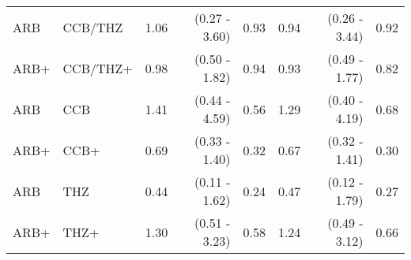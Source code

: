 \documentclass[11pt,]{article}
\begin{document}
\begin{table}[H]
{\begin{tabular}{llrrrrrr}
  ARB & CCB/THZ & 1.06 & (0.27 - 3.60) & 0.93 & 0.94 & (0.26 - 3.44) & 0.92 \\ 
  ARB+ & CCB/THZ+ & 0.98 & (0.50 - 1.82) & 0.94 & 0.93 & (0.49 - 1.77) & 0.82 \\ 
  ARB & CCB & 1.41 & (0.44 - 4.59) & 0.56 & 1.29 & (0.40 - 4.19) & 0.68 \\ 
  ARB+ & CCB+ & 0.69 & (0.33 - 1.40) & 0.32 & 0.67 & (0.32 - 1.41) & 0.30 \\ 
  ARB & THZ & 0.44 & (0.11 - 1.62) & 0.24 & 0.47 & (0.12 - 1.79) & 0.27 \\ 
  ARB+ & THZ+ & 1.30 & (0.51 - 3.23) & 0.58 & 1.24 & (0.49 - 3.12) & 0.66 \\ 
    \bottomrule
  \end{tabular}
  }
\end{table}
\begin{table}[H]
 \caption{Risk estimates for PAAS across propensity score matched, prevalent-user cohorts in the SIDIAP data source. We report uncalibrated and calibrated hazard ratios (HRs) and their 95\% confidence intervals (CIs). (+) indicates in-combination cohorts.}
\end{table}
\end{document}
